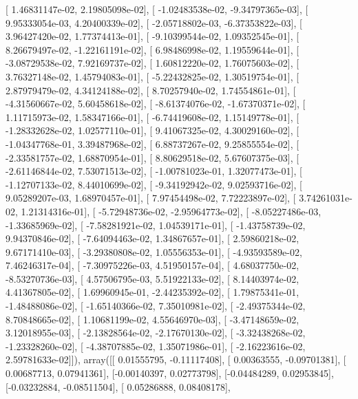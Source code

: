 \documentclass{article}
\begin{document}
       [  1.46831147e-02,   2.19805098e-02],
       [ -1.02483538e-02,  -9.34797365e-03],
       [  9.95333054e-03,   4.20400339e-02],
       [ -2.05718802e-03,  -6.37353822e-03],
       [  3.96427420e-02,   1.77374413e-01],
       [ -9.10399544e-02,   1.09352545e-01],
       [  8.26679497e-02,  -1.22161191e-02],
       [  6.98486998e-02,   1.19559644e-01],
       [ -3.08729538e-02,   7.92169737e-02],
       [  1.60812220e-02,   1.76075603e-02],
       [  3.76327148e-02,   1.45794083e-01],
       [ -5.22432825e-02,   1.30519754e-01],
       [  2.87979479e-02,   4.34124188e-02],
       [  8.70257940e-02,   1.74554861e-01],
       [ -4.31560667e-02,   5.60458618e-02],
       [ -8.61374076e-02,  -1.67370371e-02],
       [  1.11715973e-02,   1.58347166e-01],
       [ -6.74419608e-02,   1.15149778e-01],
       [ -1.28332628e-02,   1.02577110e-01],
       [  9.41067325e-02,   4.30029160e-02],
       [ -1.04347768e-01,   3.39487968e-02],
       [  6.88737267e-02,   9.25855554e-02],
       [ -2.33581757e-02,   1.68870954e-01],
       [  8.80629518e-02,   5.67607375e-03],
       [ -2.61146844e-02,   7.53071513e-02],
       [ -1.00781023e-01,   1.32077473e-01],
       [ -1.12707133e-02,   8.44010699e-02],
       [ -9.34192942e-02,   9.02593716e-02],
       [  9.05289207e-03,   1.68970457e-01],
       [  7.97454498e-02,   7.72223897e-02],
       [  3.74261031e-02,   1.21314316e-01],
       [ -5.72948736e-02,  -2.95964773e-02],
       [ -8.05227486e-03,  -1.33685969e-02],
       [ -7.58281921e-02,   1.04539171e-01],
       [ -1.43758739e-02,   9.94370846e-02],
       [ -7.64094463e-02,   1.34867657e-01],
       [  2.59860218e-02,   9.67171410e-03],
       [ -3.29380808e-02,   1.05556353e-01],
       [ -4.93593589e-02,   7.46246317e-04],
       [ -7.30975226e-03,   4.51950157e-04],
       [  4.68037750e-02,  -8.53270736e-03],
       [  4.57506795e-03,   5.51922133e-02],
       [  8.14403974e-02,   4.41367805e-02],
       [  1.69960945e-01,  -2.44235392e-02],
       [  1.79875341e-01,  -1.48488086e-02],
       [ -1.65140366e-02,   7.35010981e-02],
       [ -2.49375344e-02,   8.70848665e-02],
       [  1.10681199e-02,   4.55646970e-03],
       [ -3.47148659e-02,   3.12018955e-03],
       [ -2.13828564e-02,  -2.17670130e-02],
       [ -3.32438268e-02,  -1.23328260e-02],
       [ -4.38707885e-02,   1.35071986e-01],
       [ -2.16223616e-02,   2.59781633e-02]]), array([[ 0.01555795, -0.11117408],
       [ 0.00363555, -0.09701381],
       [ 0.00687713,  0.07941361],
       [-0.00140397,  0.02773798],
       [-0.04484289,  0.02953845],
       [-0.03232884, -0.08511504],
       [ 0.05286888,  0.08408178],
\end{document}
